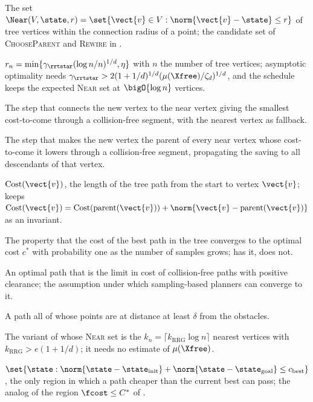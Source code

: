 \item[Near] The set $\Near(V,\state,r)=\set{\vect{v}\in V:\norm{\vect{v}-\state}\le r}$ of tree vertices within the connection radius of a point; the candidate set of \textsc{ChooseParent} and \textsc{Rewire} in \rrtstar.
\item[Connection radius] $r_n=\min\{\gamma_{\rrtstar}(\log n/n)^{1/d},\eta\}$ with $n$ the number of tree vertices; asymptotic optimality needs $\gamma_{\rrtstar}>2(1+1/d)^{1/d}(\mu(\Xfree)/\zeta_d)^{1/d}$, and the schedule keeps the expected \textsc{Near} set at $\bigO{\log n}$ vertices.
\item[ChooseParent] The \rrtstar step that connects the new vertex to the near vertex giving the smallest cost-to-come through a collision-free segment, with the nearest vertex as fallback.
\item[Rewire] The \rrtstar step that makes the new vertex the parent of every near vertex whose cost-to-come it lowers through a collision-free segment, propagating the saving to all descendants of that vertex.
\item[Cost-to-come] $\mathrm{Cost}(\vect{v})$, the length of the tree path from the start to vertex $\vect{v}$; \rrtstar keeps $\mathrm{Cost}(\vect{v})=\mathrm{Cost}(\mathrm{parent}(\vect{v}))+\norm{\vect{v}-\mathrm{parent}(\vect{v})}$ as an invariant.
\item[Asymptotic optimality] The property that the cost of the best path in the tree converges to the optimal cost $c^*$ with probability one as the number of samples grows; \rrtstar has it, \rrt does not.
\item[Robustly optimal solution] An optimal path that is the limit in cost of collision-free paths with positive clearance; the assumption under which sampling-based planners can converge to it.
\item[Strong $\delta$-clearance] A path all of whose points are at distance at least $\delta$ from the obstacles.
\item[$k$-nearest RRT*] The variant of \rrtstar whose \textsc{Near} set is the $k_n=\lceil k_{\mathrm{RRG}}\log n\rceil$ nearest vertices with $k_{\mathrm{RRG}}>e(1+1/d)$; it needs no estimate of $\mu(\Xfree)$.
\item[Informed set] $\set{\state:\norm{\state-\state_{\mathrm{init}}}+\norm{\state-\state_{\mathrm{goal}}}\le c_{\mathrm{best}}}$, the only region in which a path cheaper than the current best can pass; the analog of the region $\fcost\le C^*$ of \astar.
